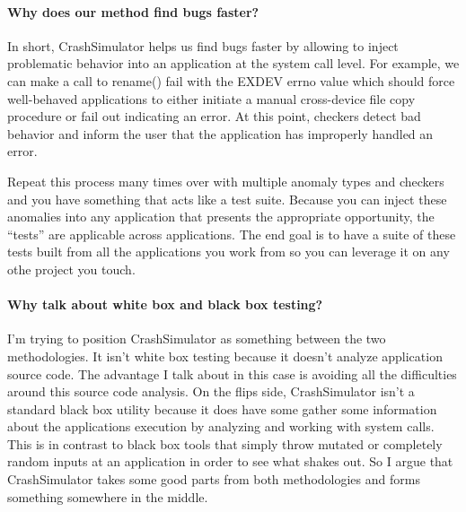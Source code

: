\paragraph{Why does our method find bugs faster?}

In short, CrashSimulator helps us find bugs faster by allowing to inject problematic behavior into an application at the
system call level. For example, we can make a call to rename() fail with the EXDEV errno value which should force
well-behaved applications to either initiate a manual cross-device file copy procedure or fail out indicating an
error. At this point, checkers detect bad behavior and inform the user that the application has improperly handled an
error.

Repeat this process many times over with multiple anomaly types and checkers and you have something that acts like a
test suite. Because you can inject these anomalies into any application that presents the appropriate opportunity, the
``tests'' are applicable across applications. The end goal is to have a suite of these tests built from all the
applications you work from so you can leverage it on any othe project you touch.

\paragraph{Why talk about white box and black box testing?}

I'm trying to position CrashSimulator as something between the two methodologies. It isn't white box testing because it
doesn't analyze application source code. The advantage I talk about in this case is avoiding all the difficulties around
this source code analysis. On the flips side, CrashSimulator isn't a standard black box utility because it does have
some gather some information about the applications execution by analyzing and working with system calls. This is in
contrast to black box tools that simply throw mutated or completely random inputs at an application in order to see what
shakes out. So I argue that CrashSimulator takes some good parts from both methodologies and forms something somewhere
in the middle.

